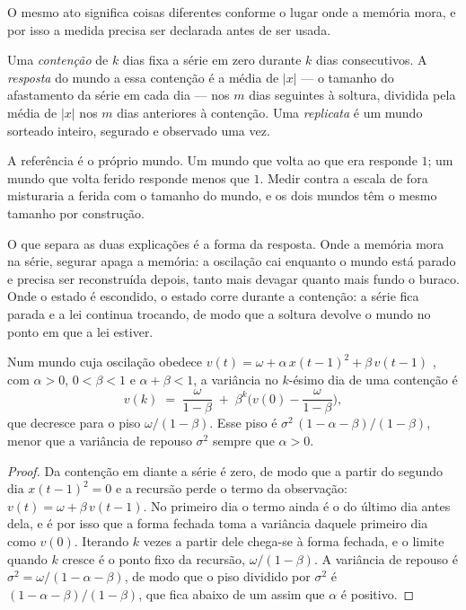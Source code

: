 O mesmo ato significa coisas diferentes conforme o lugar onde a memória mora, e por isso a medida
precisa ser declarada antes de ser usada.

\begin{definicao}\label{def:resposta}
Uma \emph{contenção} de $k$ dias fixa a série em zero durante $k$ dias consecutivos. A
\emph{resposta} do mundo a essa contenção é a média de $|x|$ --- o tamanho do afastamento da série em
cada dia --- nos $m$ dias seguintes à soltura,
dividida pela média de $|x|$ nos $m$ dias anteriores à contenção. Uma \emph{replicata} é um mundo
sorteado inteiro, segurado e observado uma vez.
\end{definicao}

A referência é o próprio mundo. Um mundo que volta ao que era responde $1$; um mundo que volta
ferido responde menos que $1$. Medir contra a escala de fora misturaria a ferida com o tamanho do
mundo, e os dois mundos têm o mesmo tamanho por construção.

O que separa as duas explicações é a forma da resposta. Onde a memória mora na série, segurar apaga
a memória: a oscilação cai enquanto o mundo está parado e precisa ser reconstruída depois, tanto
mais devagar quanto mais fundo o buraco. Onde o estado é escondido, o estado corre durante a
contenção: a série fica parada e a lei continua trocando, de modo que a soltura devolve o mundo no
ponto em que a lei estiver.

\begin{proposicao}\label{prop:piso-contencao}
Num mundo cuja oscilação obedece $v(t) = \omega + \alpha\, x(t-1)^2 + \beta\, v(t-1)$
\cite{bollerslev1986generalized}, com $\alpha > 0$, $0 < \beta < 1$ e $\alpha+\beta < 1$, a variância no $k$-ésimo dia de uma contenção é
\[
v(k) \;=\; \frac{\omega}{1-\beta} \;+\; \beta^{k}\Big( v(0) - \frac{\omega}{1-\beta} \Big),
\]
que decresce para o piso $\omega/(1-\beta)$. Esse piso é $\sigma^{2}\,(1-\alpha-\beta)/(1-\beta)$,
menor que a variância de repouso $\sigma^{2}$ sempre que $\alpha > 0$.
\end{proposicao}

\begin{proof}
Da contenção em diante a série é zero, de modo que a partir do segundo dia $x(t-1)^2 = 0$ e a
recursão perde o termo da observação: $v(t) = \omega + \beta\, v(t-1)$. No primeiro dia o termo
ainda é o do último dia antes dela, e é por isso que a forma fechada toma a variância daquele
primeiro dia como $v(0)$. Iterando $k$ vezes a partir dele chega-se à forma fechada, e o limite quando $k$ cresce é o ponto fixo da recursão, $\omega/(1-\beta)$. A
variância de repouso é $\sigma^{2} = \omega/(1-\alpha-\beta)$, de modo que o piso dividido por
$\sigma^{2}$ é $(1-\alpha-\beta)/(1-\beta)$, que fica abaixo de um assim que $\alpha$ é positivo.
\end{proof}

